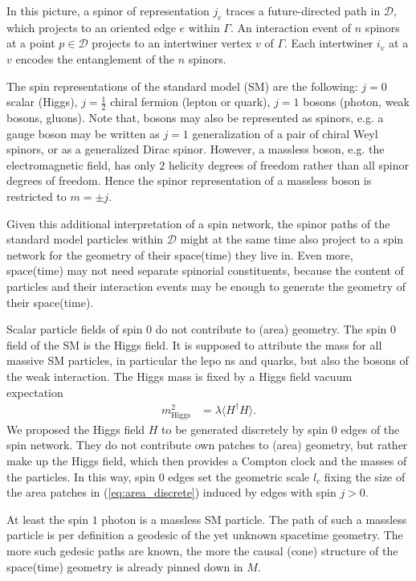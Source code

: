 \documentclass[11pt,a4paper]{article}
\theoremstyle{definition}
\begin{document}
	In this picture, a spinor of representation $j_e$ traces a future-directed path in $\mathcal{D}$, which projects to an oriented edge $e$
	within $\Gamma$. An interaction event of $n$ spinors at a point $p\in \mathcal{D}$ projects to an intertwiner vertex $v$ of $\Gamma$. Each intertwiner $i_v$ at a $v$
	encodes the entanglement of the  $n$ spinors.
	
	The spin representations of the standard model (SM) are the following: $j=0$ scalar (Higgs), $j=\frac{1}{2}$ chiral fermion (lepton or quark), $j=1$ bosons (photon, weak bosons, gluons).
	Note that, bosons may also be represented as spinors, e.g. a gauge boson may be written as $j=1$ generalization of a pair of chiral Weyl spinors, or as a generalized Dirac spinor. However, a massless boson, e.g. the electromagnetic field, has only $2$ helicity degrees of freedom rather than all spinor degrees of freedom. Hence the spinor representation of a massless boson is restricted to $m=\pm j$.  
	
	Given this additional interpretation of a spin network, the spinor paths of the standard model particles within $\mathcal{D}$ might at the same time also project to a spin network for the geometry of their space(time) they live in. Even more, space(time) may not need separate spinorial constituents, because the content of particles and their interaction events may be enough to generate the geometry of their space(time).
	
	Scalar particle fields of spin $0$ do not contribute to (area) geometry. The spin $0$ field of the SM is the Higgs field. It is supposed to attribute the mass for all massive SM particles, in particular the lepo    ns and quarks, but also the bosons of the weak interaction. 
	The Higgs mass is  fixed by a Higgs field vacuum expectation
	\begin{align}
		m_{\text{Higgs}}^2 &= \lambda\langle H^\dagger H\rangle .
	\end{align}
	We proposed the Higgs field $H$  to be generated discretely by spin $0$ edges of the spin network. They do not contribute own patches to (area) geometry, but rather make up the Higgs field, which then provides a Compton clock and the masses of the particles. In this way, spin $0$ edges set the geometric scale $l_c$ fixing the size of the area patches in (\ref{eq:area_discrete}) induced by edges with spin $j>0$.  
	
	At least the spin $1$ photon is a massless SM particle. The path of such a massless particle is per definition a geodesic of the yet unknown spacetime geometry. The more such gedesic paths are known, the more the causal (cone) structure of the space(time) geometry is already pinned down in $M$. 
	
\end{document}
